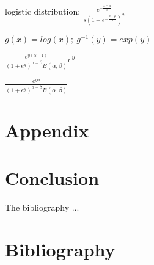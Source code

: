 \documentclass[12pt]{article}
\begin{document}
logistic distribution: $\frac{e^{-\frac{x-\mu}{s}}} {s\left(1+e^{-\frac{x-\mu}{s}}\right)^2}$

$g(x)=log(x);~g^{-1}(y)=exp(y)$

$\frac{e^{y(\alpha-1)}}{(1+e^y)^{\alpha+\beta}B(\alpha,\beta)}e^y$

$\frac{e^{y\alpha}}{(1+e^y)^{\alpha+\beta}B(\alpha,\beta)}$

\section{Appendix}
\label{sec:app}


\section{Conclusion}
\label{sec:conc}

The bibliography ...

\section{Bibliography}




\end{document}

